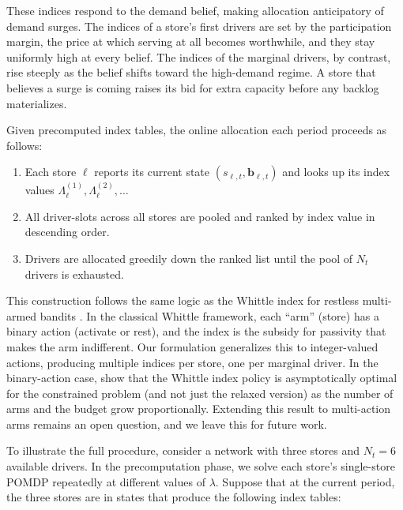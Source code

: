 \documentclass[preprint,11pt,authoryear]{elsarticle}
\newcommand{\bvec}[1]{\mathbf{#1}}
\theoremstyle{remark}
\begin{document}



These indices respond to the demand belief, making allocation anticipatory of demand surges. The indices of a store's first drivers are set by the participation margin, the price at which serving at all becomes worthwhile, and they stay uniformly high at every belief. The indices of the marginal drivers, by contrast, rise steeply as the belief shifts toward the high-demand regime. A store that believes a surge is coming raises its bid for extra capacity before any backlog materializes.

Given precomputed index tables, the online allocation each period proceeds as follows:
\begin{enumerate}[nosep]
    \item Each store $\ell$ reports its current state $(s_{\ell,t}, \bvec{b}_{\ell,t})$ and looks up its index values $\Lambda_\ell^{(1)}, \Lambda_\ell^{(2)}, \ldots$
    \item All driver-slots across all stores are pooled and ranked by index value in descending order.
    \item Drivers are allocated greedily down the ranked list until the pool of $N_t$ drivers is exhausted.
\end{enumerate}


This construction follows the same logic as the Whittle index for restless multi-armed bandits \citep{whittle1988restless}. In the classical Whittle framework, each ``arm'' (store) has a binary action (activate or rest), and the index is the subsidy for passivity that makes the arm indifferent. Our formulation generalizes this to integer-valued actions, producing multiple indices per store, one per marginal driver. In the binary-action case, \citet{weber1990index} show that the Whittle index policy is asymptotically optimal for the constrained problem (and not just the relaxed version) as the number of arms and the budget grow proportionally. Extending this result to multi-action arms remains an open question, and we leave this for future work.

To illustrate the full procedure, consider a network with three stores and $N_t = 6$ available drivers. In the precomputation phase, we solve each store's single-store POMDP repeatedly at different values of $\lambda$. Suppose that at the current period, the three stores are in states that produce the following index tables:
\end{document}
